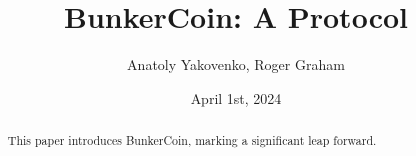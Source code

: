\documentclass{article}
\title{BunkerCoin: A Protocol}
\author{Anatoly Yakovenko, Roger Graham}
\date{April 1st, 2024}
\begin{document}
\maketitle

\begin{abstract}
This paper introduces BunkerCoin, marking a significant leap forward.
\end{abstract}
\end{document}
